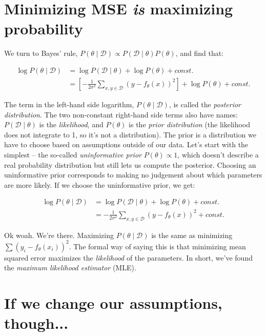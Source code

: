 \documentclass{article}
\begin{document}
\section{Minimizing MSE \emph{is} maximizing probability}

We turn to Bayes' rule, $P(\theta \mid \mathcal{D}) \propto P(\mathcal{D} \mid \theta) P(\theta)$, and find that:

\begin{align}
    \log P(\theta \mid \mathcal{D}) & =  \log P(\mathcal{D} \mid \theta) + \log P(\theta) + const. \\
    & = \left[ -\frac{1}{2\sigma^2} \sum_{x, y \in \mathcal{D}} (y - f_\theta(x))^2  \right] + \log P(\theta) + const.
\end{align}

The term in the left-hand side logarithm, $P(\theta \mid \mathcal{D})$, is called the \emph{posterior distribution}. The two non-constant right-hand side terms also have names: $P(\mathcal{D} \mid \theta)$ is the \emph{likelihood}, and $P(\theta)$ is the \emph{prior distribution} (the likelihood does not integrate to 1, so it's not a distribution). The prior is a distribution we have to choose based on assumptions outside of our data. Let's start with the simplest -- the so-called \emph{uninformative prior} $P(\theta) \propto 1$, which doesn't describe a real probability distribution but still lets us compute the posterior.
Choosing an uninformative prior corresponds to making no judgement about which parameters are more likely. If we choose the uninformative prior, we get:

\begin{align}
   \log P(\theta \mid \mathcal{D}) & =  \log P(\mathcal{D} \mid \theta) + \log P(\theta) + const. \\
   & = -\frac{1}{2\sigma^2} \sum_{x, y \in \mathcal{D}} (y - f_\theta(x))^2  + const.
\end{align}

Ok woah. We're there. Maximizing $P(\theta \mid \mathcal{D})$ is the same as minimizing $\sum (y_i - f_\theta(x_i))^2$. The formal way of saying this is that minimizing mean squared error maximizes the \emph{likelihood} of the parameters. In short, we've found the \emph{maximum likelihood estimator} (MLE).


\section{If we change our assumptions, though...}
\end{document}
